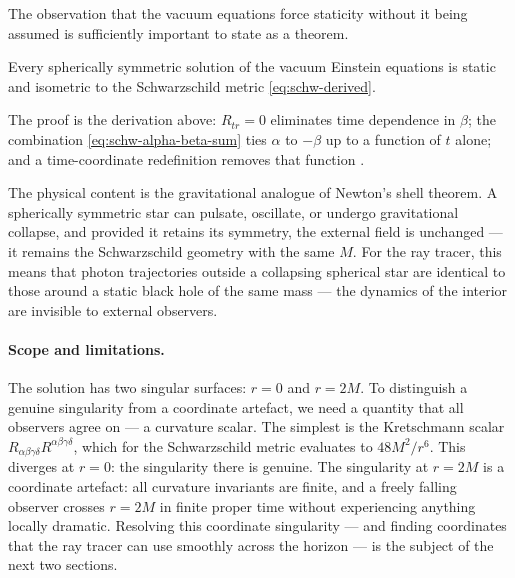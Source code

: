The observation that the vacuum equations force staticity without it
being assumed is sufficiently important to state as a theorem.

\begin{theorem}[Birkhoff, 1923]\label{thm:birkhoff}
Every spherically symmetric solution of the vacuum Einstein equations
is static and isometric to the Schwarzschild metric
\eqref{eq:schw-derived}.
\end{theorem}

The proof is the derivation above: $R_{tr} = 0$ eliminates time
dependence in $\beta$; the combination
\eqref{eq:schw-alpha-beta-sum} ties $\alpha$ to $-\beta$ up to a
function of $t$ alone; and a time-coordinate redefinition removes that
function \cite{Carroll2004,Wald1984}.

The physical content is the gravitational analogue of Newton's shell
theorem.  A spherically symmetric star can pulsate, oscillate, or
undergo gravitational collapse, and provided it retains its symmetry,
the external field is unchanged --- it remains the Schwarzschild
geometry with the same $M$.
For the ray tracer, this means that photon trajectories outside a
collapsing spherical star are identical to those around a static black
hole of the same mass --- the dynamics of the interior are invisible
to external observers.

\paragraph{Scope and limitations.}

The solution has two singular surfaces: $r = 0$ and $r = 2M$.
To distinguish a genuine singularity from a coordinate artefact,
we need a quantity that all observers agree on --- a curvature
scalar.  The simplest is the Kretschmann scalar
$R_{\alpha\beta\gamma\delta}R^{\alpha\beta\gamma\delta}$, which for
the Schwarzschild metric evaluates to $48M^2/r^6$.  This diverges
at $r = 0$: the singularity there is genuine.  The singularity at $r = 2M$ is a coordinate artefact:
all curvature invariants are finite, and a freely falling observer
crosses $r = 2M$ in finite proper time without experiencing anything
locally dramatic.  Resolving this coordinate singularity --- and finding
coordinates that the ray tracer can use smoothly across the horizon ---
is the subject of the next two sections.
